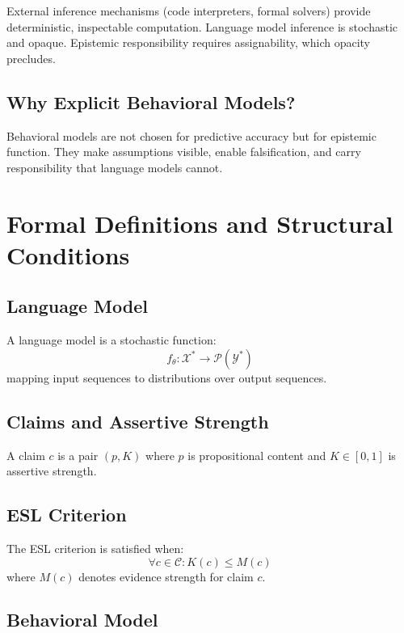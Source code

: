 \documentclass[11pt,a4paper]{article}
\begin{document}
External inference mechanisms (code interpreters, formal solvers) provide deterministic, inspectable computation. Language model inference is stochastic and opaque. Epistemic responsibility requires assignability, which opacity precludes.

\subsection{Why Explicit Behavioral Models?}

Behavioral models are not chosen for predictive accuracy but for epistemic function. They make assumptions visible, enable falsification, and carry responsibility that language models cannot.


\section{Formal Definitions and Structural Conditions}

\subsection{Language Model}

A language model is a stochastic function:
\[
f_\theta : \mathcal{X}^* \rightarrow \mathcal{P}(\mathcal{Y}^*)
\]
mapping input sequences to distributions over output sequences.

\subsection{Claims and Assertive Strength}

A claim $c$ is a pair $(p, K)$ where $p$ is propositional content and $K \in [0,1]$ is assertive strength.

\subsection{ESL Criterion}

The ESL criterion is satisfied when:
\[
\forall c \in \mathcal{C}: K(c) \le M(c)
\]
where $M(c)$ denotes evidence strength for claim $c$.

\subsection{Behavioral Model}
\end{document}

